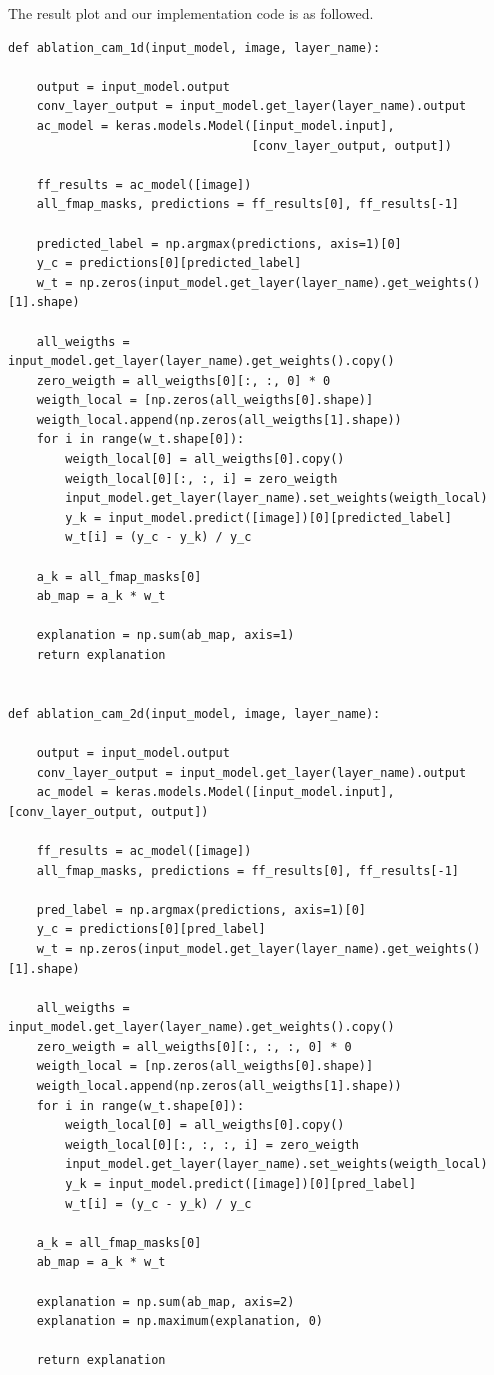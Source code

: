 \documentclass[conference]{IEEEtran}
\begin{document}
The result plot and our implementation code is as followed.

\begin{lstlisting}
def ablation_cam_1d(input_model, image, layer_name):

    output = input_model.output
    conv_layer_output = input_model.get_layer(layer_name).output
    ac_model = keras.models.Model([input_model.input],
                                  [conv_layer_output, output])

    ff_results = ac_model([image])
    all_fmap_masks, predictions = ff_results[0], ff_results[-1]

    predicted_label = np.argmax(predictions, axis=1)[0]
    y_c = predictions[0][predicted_label]
    w_t = np.zeros(input_model.get_layer(layer_name).get_weights()[1].shape)

    all_weigths = input_model.get_layer(layer_name).get_weights().copy()
    zero_weigth = all_weigths[0][:, :, 0] * 0
    weigth_local = [np.zeros(all_weigths[0].shape)]
    weigth_local.append(np.zeros(all_weigths[1].shape))
    for i in range(w_t.shape[0]):
        weigth_local[0] = all_weigths[0].copy()
        weigth_local[0][:, :, i] = zero_weigth
        input_model.get_layer(layer_name).set_weights(weigth_local)
        y_k = input_model.predict([image])[0][predicted_label]
        w_t[i] = (y_c - y_k) / y_c

    a_k = all_fmap_masks[0]
    ab_map = a_k * w_t

    explanation = np.sum(ab_map, axis=1)
    return explanation


def ablation_cam_2d(input_model, image, layer_name):

    output = input_model.output
    conv_layer_output = input_model.get_layer(layer_name).output
    ac_model = keras.models.Model([input_model.input], [conv_layer_output, output])

    ff_results = ac_model([image])
    all_fmap_masks, predictions = ff_results[0], ff_results[-1]

    pred_label = np.argmax(predictions, axis=1)[0]
    y_c = predictions[0][pred_label]
    w_t = np.zeros(input_model.get_layer(layer_name).get_weights()[1].shape)

    all_weigths = input_model.get_layer(layer_name).get_weights().copy()
    zero_weigth = all_weigths[0][:, :, :, 0] * 0
    weigth_local = [np.zeros(all_weigths[0].shape)]
    weigth_local.append(np.zeros(all_weigths[1].shape))
    for i in range(w_t.shape[0]):
        weigth_local[0] = all_weigths[0].copy()
        weigth_local[0][:, :, :, i] = zero_weigth
        input_model.get_layer(layer_name).set_weights(weigth_local)
        y_k = input_model.predict([image])[0][pred_label]
        w_t[i] = (y_c - y_k) / y_c

    a_k = all_fmap_masks[0]
    ab_map = a_k * w_t

    explanation = np.sum(ab_map, axis=2)
    explanation = np.maximum(explanation, 0)

    return explanation
\end{lstlisting}
\end{document}
